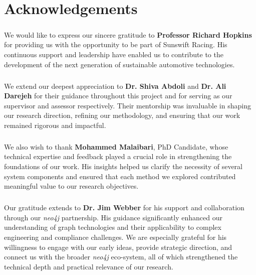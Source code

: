 \chapter*{Acknowledgements}
\label{acknowledgements}

    \paragraph{} We would like to express our sincere gratitude to \textbf{Professor Richard Hopkins} for providing us with the opportunity to be part of Sunswift Racing. His continuous support and leadership have enabled us to contribute to the development of the next generation of sustainable automotive technologies.
    
    \paragraph{} We extend our deepest appreciation to \textbf{Dr. Shiva Abdoli} and \textbf{Dr. Ali Darejeh} for their guidance throughout this project and for serving as our supervisor and assessor respectively. Their mentorship was invaluable in shaping our research direction, refining our methodology, and ensuring that our work remained rigorous and impactful.
    
    \paragraph{} We also wish to thank \textbf{Mohammed Malaibari}, PhD Candidate, whose technical expertise and feedback played a crucial role in strengthening the foundations of our work. His insights helped us clarify the necessity of several system components and ensured that each method we explored contributed meaningful value to our research objectives.
    
    \paragraph{} Our gratitude extends to \textbf{Dr. Jim Webber} for his support and collaboration through our \textit{neo4j} partnership. His guidance significantly enhanced our understanding of graph technologies and their applicability to complex engineering and compliance challenges. We are especially grateful for his willingness to engage with our early ideas, provide strategic direction, and connect us with the broader \textit{neo4j} eco-system, all of which strengthened the technical depth and practical relevance of our research.